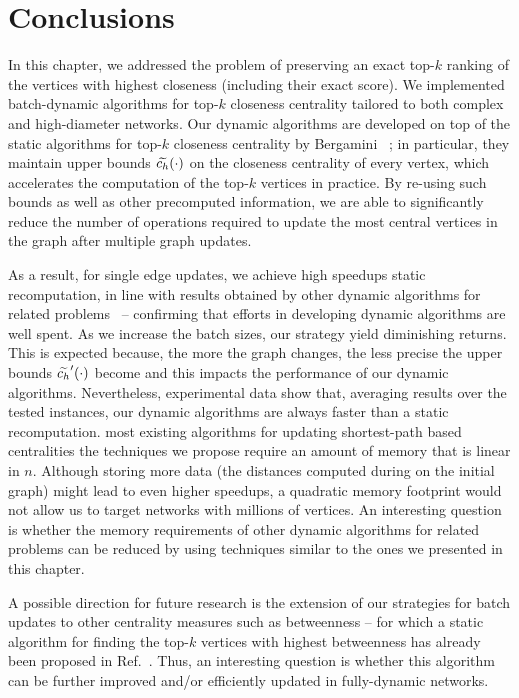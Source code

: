 \section{Conclusions}
%
In this chapter, we addressed the problem of preserving an exact top-$k$
ranking of the vertices with highest closeness (including their exact score).
We implemented batch-dynamic algorithms for top-$k$
closeness centrality tailored to both complex and high-diameter networks.
Our dynamic algorithms are developed on top of the static algorithms for top-$k$
closeness centrality by Bergamini \etal~\cite{DBLP:journals/tkdd/BergaminiBCMM19};
in particular, they maintain upper bounds $\widetilde{c_h}(\cdot)$ on the closeness
centrality of every vertex, which accelerates the computation of the top-$k$
vertices in practice.
By re-using such bounds as well as other precomputed information, we are able
to significantly reduce the number of operations required to update the most
central vertices in the graph after multiple graph updates.

As a result, for single edge updates, we achieve high speedups 
static recomputation, in line with results obtained by other dynamic algorithms
for related
problems~\cite{DBLP:journals/im/BergaminiM16,DBLP:conf/wea/BergaminiMOS17,
DBLP:conf/socialcom/GreenMB12,DBLP:conf/asunam/KasCC13} -- confirming that
efforts in developing dynamic algorithms are well spent.
%
As we increase the batch sizes, our strategy yield diminishing
returns. This is expected because, the more the graph changes, the less precise
the upper bounds $\widetilde{c_h}'(\cdot)$ become and this impacts the performance of
our dynamic algorithms. Nevertheless, experimental data show that, averaging
results over the tested instances, our dynamic algorithms are always faster
than a static recomputation.  most existing algorithms
for updating shortest-path based centralities  the techniques we propose require an
amount of memory that is  linear in $n$. Although storing more data
(\eg the distances computed during \bfscut on the initial graph) might lead to
even higher speedups, a quadratic memory footprint would not allow us to target
networks with millions of vertices. An interesting question is whether the
memory requirements of other dynamic algorithms for related problems can be
reduced by using techniques similar to the ones we presented in this chapter.

A possible direction for future research is the extension of our strategies
for batch updates to other centrality
measures such as betweenness -- for which a static algorithm for finding the
top-$k$ vertices with highest betweenness has already been proposed in
Ref.~\cite{DBLP:conf/www/LeeC14}. Thus, an interesting question is whether this
algorithm can be further improved and/or efficiently updated in fully-dynamic
networks.
